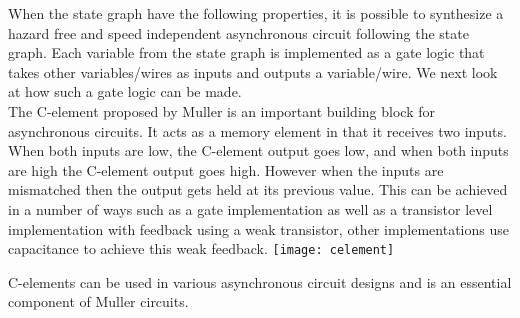 \documentclass[12pt]{report}
\begin{document}
When the state graph have the following properties, it is possible to synthesize a hazard free and speed independent asynchronous circuit following the state graph.  Each variable from the state graph is implemented as a gate logic that takes other variables/wires as inputs and outputs a variable/wire.  We next look at how such a gate logic can be made.\\ 

The C-element proposed by Muller is an important building block for asynchronous circuits.  It acts as a memory element in that it receives two inputs.  When both inputs are low, the C-element output goes low, and when both inputs are high the C-element output goes high.  However when the inputs are mismatched then the output gets held at its previous value.  This can be achieved in a number of ways such as a gate implementation as well as a transistor level implementation with feedback using a weak transistor, other implementations use capacitance to achieve this weak feedback.
\texttt{[image: celement]}

C-elements can be used in various asynchronous circuit designs and is an essential component of Muller circuits.  \\
\end{document}

